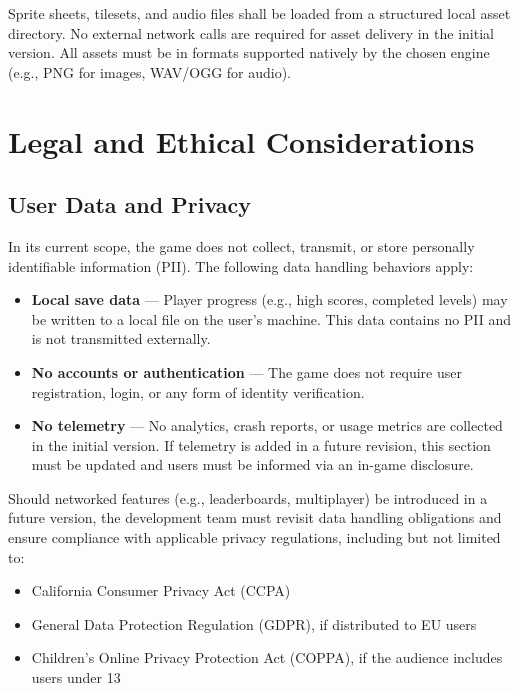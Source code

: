 \documentclass[12pt, letterpaper]{article}
\begin{document}
Sprite sheets, tilesets, and audio files shall be loaded from a structured local asset directory. No external network calls are required for asset delivery in the initial version. All assets must be in formats supported natively by the chosen engine (e.g., PNG for images, WAV/OGG for audio).

\newpage

\section{Legal and Ethical Considerations}

\subsection{User Data and Privacy}

In its current scope, the game does not collect, transmit, or store personally identifiable information (PII). The following data handling behaviors apply:

\begin{itemize}[noitemsep]
    \item \textbf{Local save data} — Player progress (e.g., high scores, completed levels) may be written to a local file on the user's machine. This data contains no PII and is not transmitted externally.
    \item \textbf{No accounts or authentication} — The game does not require user registration, login, or any form of identity verification.
    \item \textbf{No telemetry} — No analytics, crash reports, or usage metrics are collected in the initial version. If telemetry is added in a future revision, this section must be updated and users must be informed via an in-game disclosure.
\end{itemize}

Should networked features (e.g., leaderboards, multiplayer) be introduced in a future version, the development team must revisit data handling obligations and ensure compliance with applicable privacy regulations, including but not limited to:

\begin{itemize}[noitemsep]
    \item California Consumer Privacy Act (CCPA)
    \item General Data Protection Regulation (GDPR), if distributed to EU users
    \item Children's Online Privacy Protection Act (COPPA), if the audience includes users under 13
\end{itemize}
\end{document}
